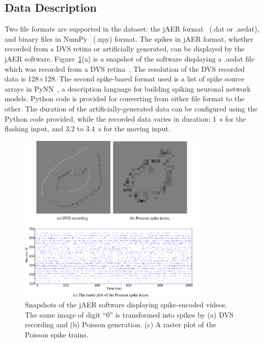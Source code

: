 \subsection{Data Description}
Two file formats are supported in the dataset: the jAER format~\cite{delbruck2008frame} (.dat or .aedat), and binary files in NumPy~\cite{numpyPython} (.npy) format.
The spikes in jAER format, whether recorded from a DVS retina or artificially generated, can be displayed by the jAER software.
Figure~\ref{fig:zero}(a) is a snapshot of the software displaying a .aedat file which was recorded from a DVS retina~\cite{serrano2013128}.
The resolution of the DVS recorded data is 128$\times$128.
The second spike-based format used is a list of spike source arrays in PyNN~\cite{davison2008pynn}, a description language for building spiking neuronal network models.
Python code is provided for converting from either file format to the other.
The duration of the artificially-generated data can be configured using the Python code provided, while the recorded data varies in duration: 1~s for the flashing input, and 3.2 to 3.4~s for the moving input.




\begin{figure}[bht!]
	\centering
	\includegraphics[width=0.8\textwidth]{pics_bench/fig1.jpg}
	\caption{
		Snapshots of the jAER software displaying spike-encoded videos.
		The same image of digit ``0'' is transformed into spikes by (a) DVS recording and (b) Poisson generation.
		(c) A raster plot of the Poisson spike trains.}
	\label{fig:zero}
\end{figure}

